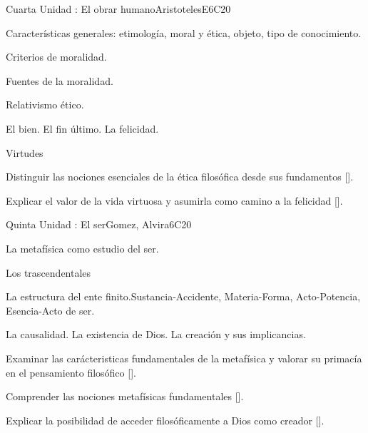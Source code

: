 \begin{syllabus}
\begin{unit}{}{Cuarta Unidad : El obrar humano}{AristotelesE}{6}{C20}
\begin{topics}
	\item Características generales: etimología, moral y ética, objeto, tipo de conocimiento.
	\item Criterios de moralidad.
	\item Fuentes de la moralidad.
	\item Relativismo ético.
	\item El bien. El fin último. La felicidad.
	\item Virtudes
\end{topics}
\begin{learningoutcomes}
	\item Distinguir las nociones esenciales de la ética filosófica desde sus fundamentos [\Usage].
    \item Explicar el valor de la vida virtuosa y asumirla como camino a la felicidad [\Usage].
\end{learningoutcomes}
\end{unit}

\begin{unit}{}{Quinta Unidad : El ser}{Gomez, Alvira}{6}{C20}
\begin{topics}
	\item La metafísica como estudio del ser.
	\item Los trascendentales
	\item La estructura del ente finito.Sustancia-Accidente, Materia-Forma, Acto-Potencia, Esencia-Acto de ser.
	\item La causalidad. La existencia de Dios. La creación y sus implicancias.
\end{topics}
\begin{learningoutcomes}
	\item Examinar las carácteristicas fundamentales de la metafísica y valorar su primacía en el pensamiento filosófico [\Usage].
    \item Comprender las nociones metafísicas fundamentales [\Usage].
    \item Explicar la posibilidad de acceder filosóficamente a Dios como creador [\Usage].
\end{learningoutcomes}
\end{unit}



\begin{coursebibliography}
\end{coursebibliography}

\end{syllabus}
